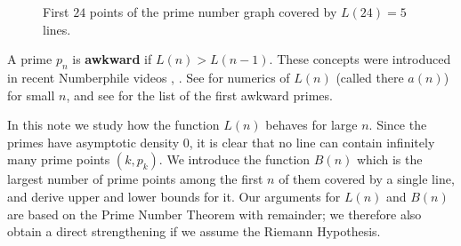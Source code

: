 \documentclass[10pt]{article}
\theoremstyle{definition}
\theoremstyle{remark}
\numberwithin{equation}{section}
\begin{document}
\begin{figure}[ht]
    \centering
    \caption{First $24$ points of the prime number graph covered by $L(24) = 5$ lines.}
\end{figure}

A prime $p_n$ is {\bf awkward} if $L(n)>L(n-1).$ These concepts were introduced in recent Numberphile videos \cite{S1}, \cite{S2}.
See \cite{O1} for numerics of $L(n)$ (called there $a(n)$)  for small $n$, and see  \cite{O2} for the list of the first awkward primes.

In this note we study how the function $L(n)$ behaves for large $n$.
 Since the primes have asymptotic
density 0, it is clear that no line can contain infinitely many prime points $(k,p_k)$.
We introduce the function $B(n)$ which is the largest number of prime points among the first $n$ of them   covered by a single line, and derive  upper and lower bounds for it.  Our arguments for $L(n)$ and
$B(n)$ are based on the Prime Number Theorem with remainder; we therefore also obtain a direct strengthening if we assume the Riemann Hypothesis.
\end{document}
